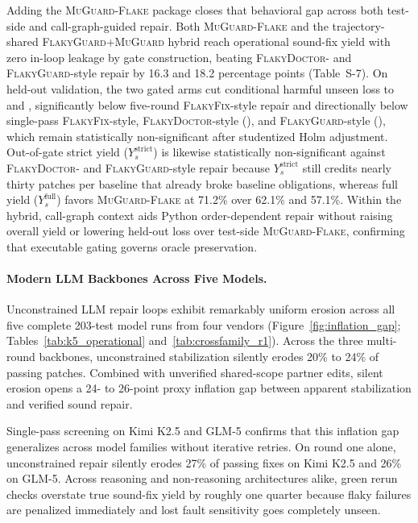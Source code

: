 Adding the \textsc{MuGuard-Flake} package closes that behavioral gap across both test-side and call-graph-guided repair. Both \textsc{MuGuard-Flake} and the trajectory-shared \textsc{FlakyGuard}+\textsc{MuGuard} hybrid reach \SotaMGSoundPct{} operational sound-fix yield with zero in-loop leakage by gate construction, beating \textsc{FlakyDoctor}- and \textsc{FlakyGuard}-style repair by 16.3 and 18.2 percentage points (Table~S-7). On held-out validation, the two gated arms cut conditional harmful unseen loss to \SotaMGHarmPct{} and \SotaFGMGHarmPct{}, significantly below five-round \textsc{FlakyFix}-style repair and directionally below single-pass \textsc{FlakyFix}-style, \textsc{FlakyDoctor}-style (\SotaFDHarmPct{}), and \textsc{FlakyGuard}-style (\SotaFGHarmPct{}), which remain statistically non-significant after studentized Holm adjustment. Out-of-gate strict yield ($Y_s^{\text{strict}}$) is likewise statistically non-significant against \textsc{FlakyDoctor}- and \textsc{FlakyGuard}-style repair because $Y_s^{\text{strict}}$ still credits nearly thirty patches per baseline that already broke baseline obligations, whereas full yield ($Y_s^{\text{full}}$) favors \textsc{MuGuard-Flake} at 71.2\% over 62.1\% and 57.1\%. Within the hybrid, call-graph context aids Python order-dependent repair without raising overall yield or lowering held-out loss over test-side \textsc{MuGuard-Flake}, confirming that executable gating governs oracle preservation.



\paragraph{Modern LLM Backbones Across Five Models.}
Unconstrained LLM repair loops exhibit remarkably uniform erosion across all five complete 203-test model runs from four vendors (Figure~\ref{fig:inflation_gap}; Tables~\ref{tab:k5_operational} and~\ref{tab:crossfamily_r1}). Across the three multi-round backbones, unconstrained stabilization silently erodes 20\% to 24\% of passing patches. Combined with unverified shared-scope partner edits, silent erosion opens a 24- to 26-point proxy inflation gap between apparent stabilization and verified sound repair.

Single-pass screening on Kimi K2.5 and GLM-5 confirms that this inflation gap generalizes across model families without iterative retries. On round one alone, unconstrained repair silently erodes 27\% of passing fixes on Kimi K2.5 and 26\% on GLM-5. Across reasoning and non-reasoning architectures alike, green rerun checks overstate true sound-fix yield by roughly one quarter because flaky failures are penalized immediately and lost fault sensitivity goes completely unseen.

